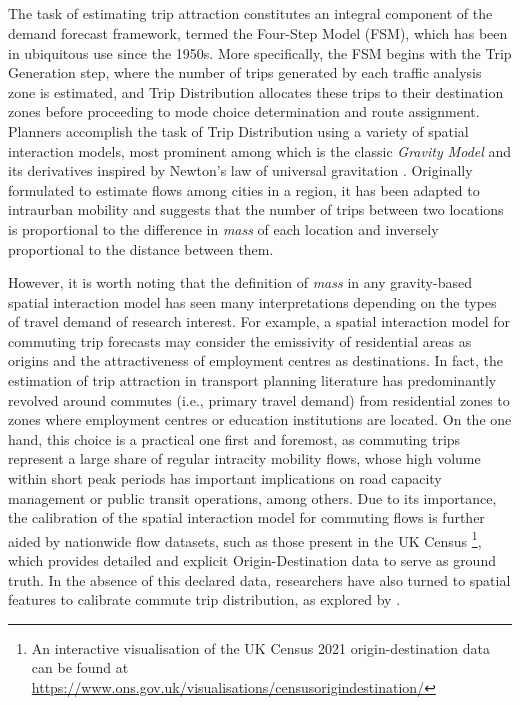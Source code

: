 
\subsection*{}

The task of estimating trip attraction constitutes an integral component of the demand forecast framework, termed the Four-Step Model (FSM), which has been in ubiquitous use since the 1950s. More specifically, the FSM begins with the Trip Generation step, where the number of trips generated by each traffic analysis zone is estimated, and Trip Distribution allocates these trips to their destination zones before proceeding to mode choice determination and route assignment. Planners accomplish the task of Trip Distribution using a variety of spatial interaction models, most prominent among which is the classic \textit{Gravity Model} and its derivatives inspired by Newton's law of universal gravitation \citep{erlanderGravityModelTransportation1990}. Originally formulated to estimate flows among cities in a region, it has been adapted to intraurban mobility and suggests that the number of trips between two locations is proportional to the difference in \textit{mass} of each location and inversely proportional to the distance between them. 

However, it is worth noting that the definition of \textit{mass} in any gravity-based spatial interaction model has seen many interpretations depending on the types of travel demand of research interest. For example, a spatial interaction model for commuting trip forecasts may consider the emissivity of residential areas as origins and the attractiveness of employment centres as destinations. In fact, the estimation of trip attraction in transport planning literature has predominantly revolved around commutes (i.e., primary travel demand) from residential zones to zones where employment centres or education institutions are located. On the one hand, this choice is a practical one first and foremost, as commuting trips represent a large share of regular intracity mobility flows, whose high volume within short peak periods has important implications on road capacity management or public transit operations, among others. Due to its importance, the calibration of the spatial interaction model for commuting flows is further aided by nationwide flow datasets, such as those present in the UK Census \footnote{An interactive visualisation of the UK Census 2021 origin-destination data can be found at \url{https://www.ons.gov.uk/visualisations/censusorigindestination/}}, which provides detailed and explicit Origin-Destination data to serve as ground truth. In the absence of this declared data, researchers have also turned to spatial features to calibrate commute trip distribution, as explored by \cite{yangLimitsPredictabilityCommuting2014}.

